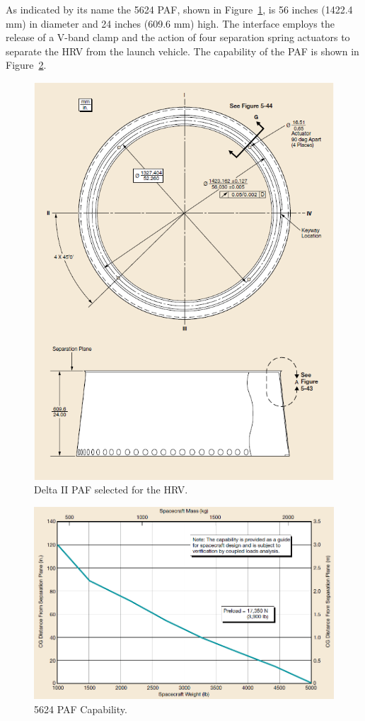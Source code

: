 \documentclass[paper=letter, fontsize=11pt]{scrartcl} %
\numberwithin{equation}{section} %
\numberwithin{figure}{section} %
\numberwithin{table}{section} %
\begin{document}
As indicated by its name the 5624 PAF, shown in Figure~\ref{fig:13.5}, is 56 inches (1422.4 mm) in diameter and 24 inches (609.6 mm) high. The interface employs the release of a V-band clamp and the action of four separation spring actuators to separate the HRV from the launch vehicle. The capability of the PAF is shown in Figure~\ref{fig:13.6}.

\begin{figure}[H]
    \begin{center}
    \includegraphics[width=.75\textwidth]{SS13_Shock_PAF/13-5.png}
    \caption{Delta II PAF selected for the HRV.}
    \label{fig:13.5}
    \end{center}
\end{figure}

\begin{figure}[H]
    \begin{center}
    \includegraphics[width=.75\textwidth]{SS13_Shock_PAF/13-6.png}
    \caption{5624 PAF Capability.}
    \label{fig:13.6}
    \end{center}
\end{figure}
\end{document}
